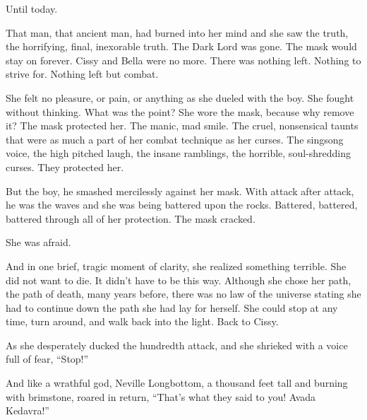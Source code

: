 Until today.

That man, that ancient man, had burned into her mind and she saw the truth, the horrifying, final, inexorable truth. The Dark Lord was gone. The mask would stay on forever. Cissy and Bella were no more. There was nothing left. Nothing to strive for. Nothing left but combat.

She felt no pleasure, or pain, or anything as she dueled with the boy. She fought without thinking. What was the point? She wore the mask, because why remove it? The mask protected her. The manic, mad smile. The cruel, nonsensical taunts that were as much a part of her combat technique as her curses. The singsong voice, the high pitched laugh, the insane ramblings, the horrible, soul-shredding curses. They protected her.

But the boy, he smashed mercilessly against her mask. With attack after attack, he was the waves and she was being battered upon the rocks. Battered, battered, battered through all of her protection. The mask cracked.

She was afraid.

And in one brief, tragic moment of clarity, she realized something terrible. She did not want to die. It didn’t have to be this way. Although she chose her path, the path of death, many years before, there was no law of the universe stating she had to continue down the path she had lay for herself. She could stop at any time, turn around, and walk back into the light. Back to Cissy.

As she desperately ducked the hundredth attack, and she shrieked with a voice full of fear, “Stop!”

And like a wrathful god, Neville Longbottom, a thousand feet tall and burning with brimstone, roared in return, “That’s what they said to you!  Avada Kedavra!”
